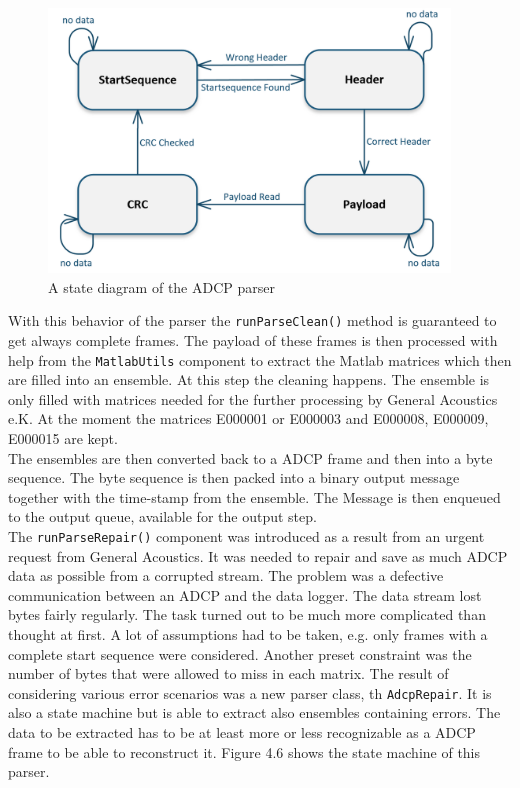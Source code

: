 \begin{figure}[h]
\centering
      \includegraphics[width=0.95\textwidth]{parser}
        \caption{A state diagram of the ADCP parser}
\end{figure}

With this behavior of the parser the \texttt{runParseClean()} method is  guaranteed to get always complete frames. The payload of these frames is then processed with help from the \texttt{MatlabUtils} component to extract the Matlab matrices which then are filled into an ensemble. At this step the cleaning happens. The ensemble is only filled with matrices needed for the further processing by General Acoustics e.K. At the moment the matrices E000001 or E000003 and E000008, E000009, E000015 are kept.\\
The ensembles are then converted back to a ADCP frame and then into a byte sequence. The byte sequence is then packed into a binary output message together with the time-stamp from the ensemble. The Message is then enqueued to the output queue, available for the output step.\\

The \texttt{runParseRepair()} component was introduced as a result from an urgent request from General Acoustics. It was needed to repair and save as much ADCP data as possible from a corrupted stream. The problem was a defective communication between an ADCP and the data logger. The data stream lost bytes fairly regularly.
The task turned out to be much more complicated than thought at first. A lot of assumptions had to be taken, e.g. only frames with a complete start sequence were considered. Another preset constraint was the number of bytes that were allowed to miss in each matrix. The result of considering various error scenarios was a new parser class, th \texttt{AdcpRepair}. It is also a state machine but is able to extract also ensembles containing errors. The data to be extracted has to be at least more or less recognizable as a ADCP frame to be able to reconstruct it. Figure 4.6 shows the state machine of this parser.\\

